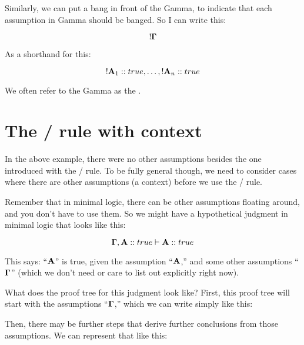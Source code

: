 \documentclass[../../../main.tex]{subfiles}
\begin{document}
\noindent
Similarly, we can put a bang in front of the Gamma, to indicate that each assumption in Gamma should be banged. So I can write this:

\begin{equation*}
  \bang/\nd{\context/}
\end{equation*}

\noindent
As a shorthand for this:

\begin{equation*}
  \bang/\nd{A}_{1} :: true, \ldots, \bang/\nd{A}_{n} :: true
\end{equation*}

\noindent
We often refer to the Gamma as the .


\section{The \startrule/ rule with context}

In the above example, there were no other assumptions besides the one introduced with the \startrule/ rule. To be fully general though, we need to consider cases where there are other assumptions (a context) before we use the \startrule/ rule.

Remember that in minimal logic, there can be other assumptions floating around, and you don't have to use them. So we might have a hypothetical judgment in minimal logic that looks like this:

\begin{equation*}
  \nd{\context/}, \nd{A} :: true \ndturnstile/ \nd{A} :: true
\end{equation*}

\noindent
This says: ``$\mathbf{A}$'' is true, given the assumption ``$\mathbf{A}$,'' and some other assumptions ``$\nd{\context/}$'' (which we don't need or care to list out explicitly right now).

What does the proof tree for this judgment look like? First, this proof tree will start with the assumptions ``$\nd{\context/}$,'' which we can write simply like this:

\begin{prooftree*}
  \hypo{}
  \ellipsis{}{}
\end{prooftree*}

\noindent
Then, there may be further steps that derive further conclusions from those assumptions. We can represent that like this:
\end{document}
